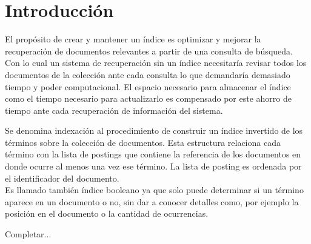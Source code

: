 
\section{Introducción}

El propósito de crear y mantener un índice es optimizar y mejorar la recuperación de documentos relevantes a partir de una consulta de búsqueda. Con lo cual un sistema de recuperación sin un índice necesitaría revisar todos los documentos de la colección ante cada consulta lo que demandaría demasiado tiempo y poder computacional. El espacio necesario para almacenar el índice como el tiempo necesario para actualizarlo es compensado por este ahorro de tiempo ante cada recuperación de información del sistema. \par

Se denomina indexación al procedimiento de construir un índice invertido de los términos sobre la colección de documentos. Esta estructura relaciona cada término con la lista de postings que contiene la referencia de los documentos en donde ocurre al menos una vez ese término. La lista de posting es ordenada por el identificador del documento. \\
Es llamado también índice booleano ya que solo puede determinar si un término aparece en un documento o no, sin dar a conocer detalles como, por ejemplo la posición en el documento o la cantidad de ocurrencias. \par
Completar...